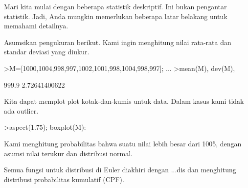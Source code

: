 \documentclass[a4paper,10pt]{article}
\begin{document}
\begin{eulernotebook}
\begin{eulercomment}
\begin{eulercomment}
\begin{eulercomment}
\begin{eulercomment}
\begin{eulercomment}
\begin{eulercomment}
\begin{eulercomment}
\begin{eulercomment}
\begin{eulercomment}
\begin{eulercomment}
\begin{eulercomment}
\begin{eulercomment}
\begin{eulercomment}
\begin{eulercomment}
\begin{eulercomment}
\begin{eulercomment}
\begin{eulercomment}
\begin{eulercomment}
\begin{eulercomment}
Mari kita mulai dengan beberapa statistik deskriptif. Ini bukan
pengantar statistik. Jadi, Anda mungkin memerlukan beberapa latar
belakang untuk memahami detailnya.

Asumsikan pengukuran berikut. Kami ingin menghitung nilai rata-rata
dan standar deviasi yang diukur.
\end{eulercomment}
\begin{eulerprompt}
>M=[1000,1004,998,997,1002,1001,998,1004,998,997]; ...
>mean(M), dev(M),
\end{eulerprompt}
\begin{euleroutput}
  999.9
  2.72641400622
\end{euleroutput}
\begin{eulercomment}
Kita dapat memplot plot kotak-dan-kumis untuk data. Dalam kasus kami
tidak ada outlier.
\end{eulercomment}
\begin{eulerprompt}
>aspect(1.75); boxplot(M):
\end{eulerprompt}
\begin{eulercomment}
Kami menghitung probabilitas bahwa suatu nilai lebih besar dari 1005,
dengan asumsi nilai terukur dan distribusi normal.

Semua fungsi untuk distribusi di Euler diakhiri dengan ...dis dan
menghitung distribusi probabilitas kumulatif (CPF).


\end{eulercomment}
\end{eulercomment}
\end{eulercomment}
\end{eulercomment}
\end{eulercomment}
\end{eulercomment}
\end{eulercomment}
\end{eulercomment}
\end{eulercomment}
\end{eulercomment}
\end{eulercomment}
\end{eulercomment}
\end{eulercomment}
\end{eulercomment}
\end{eulercomment}
\end{eulercomment}
\end{eulercomment}
\end{eulercomment}
\end{eulercomment}
\end{eulernotebook}
\end{document}
